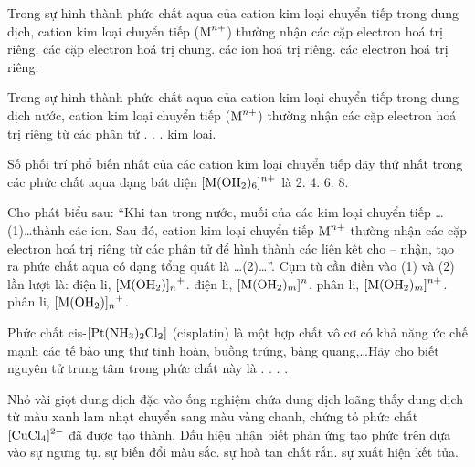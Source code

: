 \documentclass[11pt,a4paper]{article}
\def\loigiai#1{}
\begin{document}
\newpage

\begin{ex}
Trong sự hình thành phức chất aqua của cation kim loại chuyển tiếp trong dung dịch, cation kim loại chuyển tiếp ($\ce{M^{n+}}$) thường nhận
\choice
{các cặp electron hoá trị riêng.}
{các cặp electron hoá trị chung.}
{các ion hoá trị riêng.}
{các electron hoá trị riêng.}
\loigiai{}
\end{ex}

\begin{ex}
Trong sự hình thành phức chất aqua của cation kim loại chuyển tiếp trong dung dịch nước, cation kim loại chuyển tiếp ($\ce{M^{n+}}$) thường nhận các cặp electron hoá trị riêng từ các phân tử
\choice
{.}
{.}
{.}
{kim loại.}
\loigiai{}
\end{ex}

\begin{ex}
Số phối trí phổ biến nhất của các cation kim loại chuyển tiếp dãy thứ nhất trong các phức chất aqua dạng bát diện $\ce{[M(OH2)6]^{n+}}$ là
\choice
{2.}
{4.}
{6.}
{8.}
\loigiai{}
\end{ex}

\begin{ex}
Cho phát biểu sau: ``Khi tan trong nước, muối của các kim loại chuyển tiếp \dots(1)\dots thành các ion. Sau đó, cation kim loại chuyển tiếp $\ce{M^{n+}}$ thường nhận các cặp electron hoá trị riêng từ các phân tử  để hình thành các liên kết cho -- nhận, tạo ra phức chất aqua có dạng tổng quát là \dots(2)\dots''. Cụm từ cần điền vào (1) và (2) lần lượt là:
\choice
{điện li, $\ce{[M(OH2)]_n+}$.}
{điện li, $\ce{[M(OH2)_m]^n}$.}
{phân li, $\ce{[M(OH2)_m]^{n+}}$.}
{phân li, $\ce{[M(OH2)]_n+}$.}
\loigiai{}
\end{ex}

\begin{ex}
Phức chất cis-$\ce{[Pt(NH3)2Cl2]}$ (cisplatin) là một hợp chất vô cơ có khả năng ức chế mạnh các tế bào ung thư tinh hoàn, buồng trứng, bàng quang,\dots Hãy cho biết nguyên tử trung tâm trong phức chất này là
\choice
{.}
{.}
{.}
{.}
\loigiai{}
\end{ex}

\begin{ex}
Nhỏ vài giọt dung dịch  đặc vào ống nghiệm chứa dung dịch  loãng thấy dung dịch từ màu xanh lam nhạt chuyển sang màu vàng chanh, chứng tỏ phức chất $\ce{[CuCl4]^2-}$ đã được tạo thành. Dấu hiệu nhận biết phản ứng tạo phức trên dựa vào
\choice
{sự ngưng tụ.}
{sự biến đổi màu sắc.}
{sự hoà tan chất rắn.}
{sự xuất hiện kết tủa.}
\loigiai{}
\end{ex}
\end{document}
